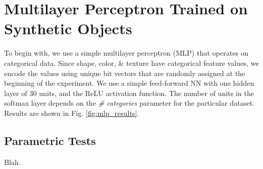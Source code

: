 \section{Multilayer Perceptron Trained on Synthetic Objects}
\label{sec:simple_mlp}
To begin with, we use a simple multilayer perceptron (MLP) that operates on categorical
data. Since shape, color, \& texture have categorical feature values, we encode the values
using unique bit vectors that are randomly assigned at the beginning of the experiment. We
use a simple feed-forward NN with one hidden layer of 30 units, and the ReLU activation
function. The number of units in the softmax layer depends on the \textit{\# categories}
parameter for the particular dataset. Results are shown in Fig. \ref{fig:mlp_results}.
\subsection{Parametric Tests}
Blah.